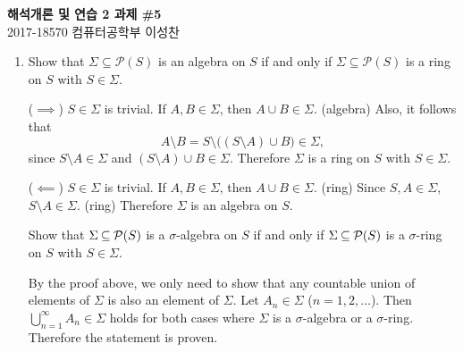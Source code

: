 \documentclass[12pt]{report}
\newcommand{\numl}[1]{\item[\large\textbf{\sffamily #1.}]}
\newcommand{\ds}{\displaystyle}
\newcommand{\mc}[1]{\mathcal{#1}}
\newcommand{\bs}{\setminus}
\renewcommand{\subset}{\subseteq}
\newcommand{\mimp}{\(\implies\)}
\newcommand{\mimpd}{\(\impliedby\)}
\begin{document}
\begin{center}
    \textbf{\Large 해석개론 및 연습 2 과제 \#5}\\
    \large 2017-18570 컴퓨터공학부 이성찬
\end{center}
\begin{enumerate}

    \numl{1} {\sffamily Show that \(\Sigma \subset \mc{P}(S)\) is an algebra on \(S\) if and only if \(\Sigma \subset \mc{P}(S)\) is a ring on \(S\) with \(S \in \Sigma\).}

    (\mimp) \(S\in \Sigma\) is trivial. If \(A, B\in \Sigma\), then \(A \cup B\in \Sigma\). (algebra) Also, it follows that
    \[
        A \bs B = S \bs \big((S \bs A) \cup B \big) \in \Sigma,
    \]
    since \(S \bs A \in \Sigma\) and \((S \bs A) \cup B \in \Sigma\). Therefore \(\Sigma\) is a ring on \(S\) with \(S \in \Sigma\).

    (\mimpd) \(S\in \Sigma\) is trivial. If \(A, B\in \Sigma\), then \(A \cup B\in \Sigma\). (ring) Since \(S, A\in \Sigma\), \(S \bs A \in \Sigma\). (ring) Therefore \(\Sigma\) is an algebra on \(S\).

    \vspace*{10px}

    {\sffamily Show that \(\Sigma \hspace*{-0.6px} \subset \hspace*{-0.6px} \mc{P}(S)\) is a \(\sigma\)-algebra on \(S\) if and only if \(\Sigma \hspace*{-0.5px} \subset \hspace*{-0.5px} \mc{P}(S)\) is a \(\sigma\)-ring on \(S\) with \(S \in \Sigma\).}

    By the proof above, we only need to show that any countable union of elements of \(\Sigma\) is also an element of \(\Sigma\). Let \(A_n \in \Sigma\) (\(n = 1, 2, \dots\)). Then \(\ds \bigcup_{n=1}^\infty A_n \in \Sigma\) holds for both cases where \(\Sigma\) is a \(\sigma\)-algebra or a \(\sigma\)-ring. Therefore the statement is proven.


\end{enumerate}
\end{document}
